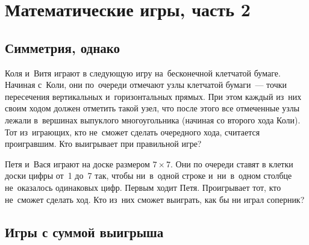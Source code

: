 

\section*{Математические игры, часть 2}



\subsection*{Симметрия, однако}

\begin{problems}

\item
Коля и~Витя играют в следующую игру на~бесконечной клетчатой бумаге.
Начиная с~Коли, они по~очереди отмечают узлы клетчатой бумаги~--- точки
пересечения вертикальных и~горизонтальных прямых.
При этом каждый из~них своим ходом должен отметить такой узел, что после этого
все отмеченные узлы лежали в~вершинах выпуклого многоугольника
(начиная со второго хода Коли).
Тот из~играющих, кто не~сможет сделать очередного хода, считается проигравшим.
Кто выигрывает при правильной игре? 

\item
Петя и~Вася играют на доске размером $7 \times 7$.
Они по очереди ставят в клетки доски цифры от~1 до~7 так, чтобы ни~в~одной
строке и~ни~в~одном столбце не~оказалось одинаковых цифр.
Первым ходит Петя.
Проигрывает тот, кто не~сможет сделать ход.
Кто из~них сможет выиграть, как бы ни играл соперник?

\end{problems}

\subsection*{Игры с суммой выигрыша}

